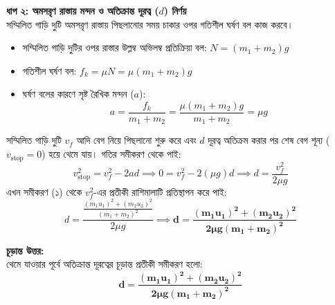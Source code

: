 \documentclass[12pt, a4paper]{article}
\begin{document}
\begin{tcolorbox}[solutionbox={সমাধান (Solution)}]
\begin{center}
\end{center}
\vspace{1em}

\noindent
\textbf{ধাপ ২: অমসরৃণ রাস্তায় মন্দন ও অতিক্রান্ত দূরত্ব ($d$) নির্ণয়} \\
সম্মিলিত গাড়ি দুটি অমসরৃণ রাস্তায় পিছলানোর সময় চাকার ওপর গতিশীল ঘর্ষণ বল কাজ করবে।
\begin{itemize}[leftmargin=*, parsep=0.3ex]
    \item সম্মিলিত গাড়ি দুটির ওপর রাস্তার উল্লম্ব অভিলম্ব প্রতিক্রিয়া বল: $N = (m_1 + m_2)g$
    \item গতিশীল ঘর্ষণ বল: $f_k = \mu N = \mu (m_1 + m_2)g$
    \item ঘর্ষণ বলের কারণে সৃষ্ট রৈখিক মন্দন ($a$): 
    \[ a = \frac{f_k}{m_1 + m_2} = \frac{\mu (m_1 + m_2)g}{m_1 + m_2} = \mu g \]
\end{itemize}

সম্মিলিত গাড়ি দুটি $v_f$ আদি বেগ নিয়ে পিছলানো শুরু করে এবং $d$ দূরত্ব অতিক্রম করার পর শেষ বেগ শূন্য ($v_{\text{stop}} = 0$) হয়ে থেমে যায়। গতির সমীকরণ থেকে পাই:
\[ v_{\text{stop}}^2 = v_f^2 - 2ad \implies 0 = v_f^2 - 2(\mu g)d \implies d = \frac{v_f^2}{2\mu g} \]
এখন সমীকরণ (১) থেকে $v_f^2$-এর প্রতীকী রাশিমালাটি প্রতিস্থাপন করে পাই:
\[ d = \frac{\frac{(m_1 u_1)^2 + (m_2 u_2)^2}{(m_1 + m_2)^2}}{2\mu g} \implies \mathbf{d = \frac{(m_1 u_1)^2 + (m_2 u_2)^2}{2\mu g (m_1 + m_2)^2}} \]

\vspace{1em}
\begin{tcolorbox}[answerbox]
\textbf{চূড়ান্ত উত্তর:} \\
থেমে যাওয়ার পূর্বে অতিক্রান্ত দূরত্বের চূড়ান্ত প্রতীকী সমীকরণ হলো:
\[ \mathbf{d = \frac{(m_1 u_1)^2 + (m_2 u_2)^2}{2\mu g (m_1 + m_2)^2}} \]
\end{tcolorbox}
\end{tcolorbox}
\end{document}

